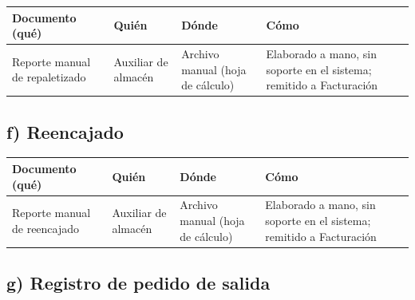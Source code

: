 \documentclass[11pt, a4paper, oneside]{report}
\begin{document}
\begin{table}[H]
\centering\small
\renewcommand{\arraystretch}{1.25}
\setlength{\tabcolsep}{5pt}
\begin{tabularx}{\textwidth}{|>{\raggedright\arraybackslash}X|>{\raggedright\arraybackslash}p{}|>{\raggedright\arraybackslash}p{}|>{\raggedright\arraybackslash}X|}
\hline
\rowcolor{upeu_mid}
\color{white}\bfseries Documento (qué) & \color{white}\bfseries Quién & \color{white}\bfseries Dónde & \color{white}\bfseries Cómo \\ \hline
\rowcolor{gray!10}
Reporte manual de repaletizado & Auxiliar de almacén & Archivo manual (hoja de cálculo) & Elaborado a mano, sin soporte en el sistema; remitido a Facturación \\ \hline
\end{tabularx}
\end{table}

\subsection*{f) Reencajado}

\begin{table}[H]
\centering\small
\renewcommand{\arraystretch}{1.25}
\setlength{\tabcolsep}{5pt}
\begin{tabularx}{\textwidth}{|>{\raggedright\arraybackslash}X|>{\raggedright\arraybackslash}p{}|>{\raggedright\arraybackslash}p{}|>{\raggedright\arraybackslash}X|}
\hline
\rowcolor{upeu_mid}
\color{white}\bfseries Documento (qué) & \color{white}\bfseries Quién & \color{white}\bfseries Dónde & \color{white}\bfseries Cómo \\ \hline
\rowcolor{gray!10}
Reporte manual de reencajado & Auxiliar de almacén & Archivo manual (hoja de cálculo) & Elaborado a mano, sin soporte en el sistema; remitido a Facturación \\ \hline
\end{tabularx}
\end{table}

\subsection*{g) Registro de pedido de salida}
\end{document}
